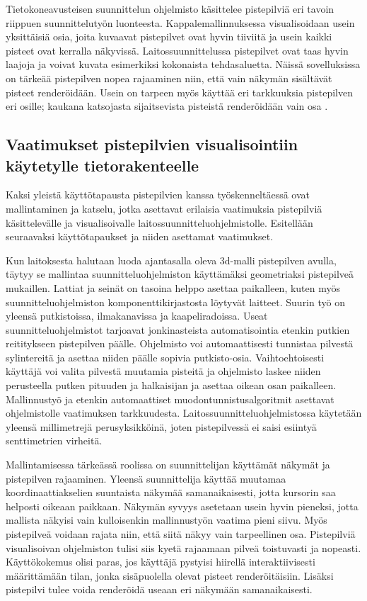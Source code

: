 Tietokoneavusteisen suunnittelun ohjelmisto käsittelee pistepilviä eri tavoin riippuen suunnittelutyön luonteesta. Kappalemallinnuksessa visualisoidaan usein yksittäisiä osia, joita kuvaavat pistepilvet ovat hyvin tiiviitä ja usein kaikki pisteet ovat kerralla näkyvissä. Laitossuunnittelussa pistepilvet ovat taas hyvin laajoja ja voivat kuvata esimerkiksi kokonaista tehdasaluetta. Näissä sovelluksissa on tärkeää pistepilven nopea rajaaminen niin, että vain näkymän sisältävät pisteet renderöidään. Usein on tarpeen myös käyttää eri tarkkuuksia pistepilven eri osille; kaukana katsojasta sijaitsevista pisteistä renderöidään vain osa \cite{mikko}. 

\subsection{Vaatimukset pistepilvien visualisointiin käytetylle tietorakenteelle}\label{usecase}

Kaksi yleistä käyttötapausta pistepilvien kanssa työskenneltäessä ovat mallintaminen ja katselu, jotka asettavat erilaisia vaatimuksia pistepilviä käsittelevälle ja visualisoivalle laitossuunnitteluohjelmistolle. Esitellään seuraavaksi käyttötapaukset ja niiden asettamat vaatimukset. 

Kun laitoksesta halutaan luoda ajantasalla oleva 3d-malli pistepilven avulla, täytyy se mallintaa suunnitteluohjelmiston käyttämäksi geometriaksi pistepilveä mukaillen. Lattiat ja seinät on tasoina helppo asettaa paikalleen, kuten myös suunnitteluohjelmiston komponenttikirjastosta löytyvät laitteet. Suurin työ on yleensä putkistoissa, ilmakanavissa ja kaapeliradoissa. Useat suunnitteluohjelmistot tarjoavat jonkinasteista automatisointia etenkin putkien reititykseen pistepilven päälle. Ohjelmisto voi automaattisesti tunnistaa pilvestä sylintereitä ja asettaa niiden päälle sopivia putkisto-osia. Vaihtoehtoisesti käyttäjä voi valita pilvestä muutamia pisteitä ja ohjelmisto laskee niiden perusteella putken pituuden ja halkaisijan ja asettaa oikean osan paikalleen. Mallinnustyö ja etenkin automaattiset muodontunnistusalgoritmit asettavat ohjelmistolle vaatimuksen tarkkuudesta. Laitossuunnitteluohjelmistossa käytetään yleensä millimetrejä perusyksikköinä, joten pistepilvessä ei saisi esiintyä senttimetrien virheitä.

Mallintamisessa tärkeässä roolissa on suunnittelijan käyttämät näkymät ja pistepilven rajaaminen. Yleensä suunnittelija käyttää muutamaa koordinaattiakselien suuntaista näkymää samanaikaisesti, jotta kursorin saa helposti oikeaan paikkaan. Näkymän syvyys asetetaan usein hyvin pieneksi, jotta mallista näkyisi vain kulloisenkin mallinnustyön vaatima pieni siivu. Myös pistepilveä voidaan rajata niin, että siitä näkyy vain tarpeellinen osa. Pistepilviä visualisoivan ohjelmiston tulisi siis kyetä rajaamaan pilveä toistuvasti ja nopeasti. Käyttökokemus olisi paras, jos käyttäjä pystyisi hiirellä interaktiivisesti määrittämään tilan, jonka sisäpuolella olevat pisteet renderöitäisiin. Lisäksi pistepilvi tulee voida renderöidä useaan eri näkymään samanaikaisesti.

